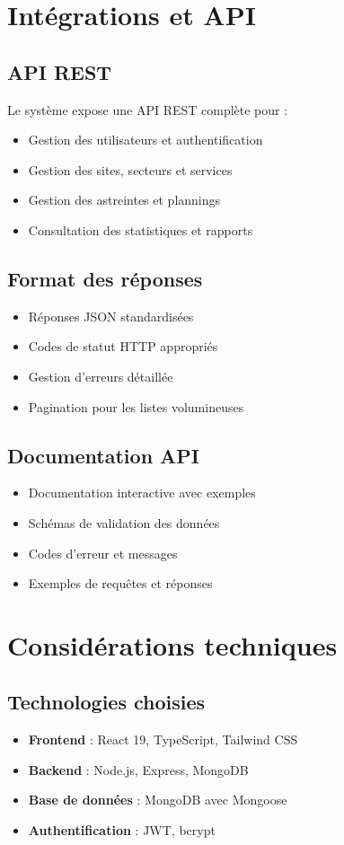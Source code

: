 \section{Intégrations et API}
\subsection{API REST}
Le système expose une API REST complète pour :
\begin{itemize}
    \item Gestion des utilisateurs et authentification
    \item Gestion des sites, secteurs et services
    \item Gestion des astreintes et plannings
    \item Consultation des statistiques et rapports
\end{itemize}

\subsection{Format des réponses}
\begin{itemize}
    \item Réponses JSON standardisées
    \item Codes de statut HTTP appropriés
    \item Gestion d'erreurs détaillée
    \item Pagination pour les listes volumineuses
\end{itemize}

\subsection{Documentation API}
\begin{itemize}
    \item Documentation interactive avec exemples
    \item Schémas de validation des données
    \item Codes d'erreur et messages
    \item Exemples de requêtes et réponses
\end{itemize}

\section{Considérations techniques}
\subsection{Technologies choisies}
\begin{itemize}
    \item \textbf{Frontend} : React 19, TypeScript, Tailwind CSS
    \item \textbf{Backend} : Node.js, Express, MongoDB
    \item \textbf{Base de données} : MongoDB avec Mongoose
    \item \textbf{Authentification} : JWT, bcrypt
\end{itemize}

